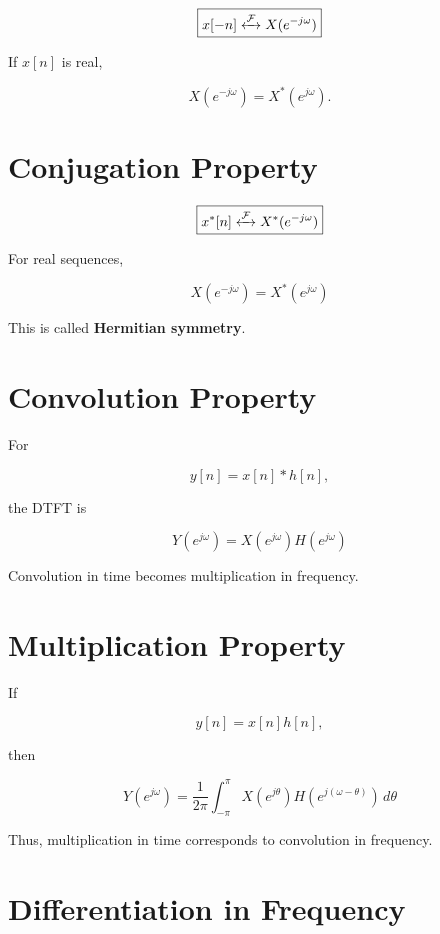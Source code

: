 \[
\boxed{
x[-n]
\xleftrightarrow{\mathcal{F}}
X(e^{-j\omega})
}
\]

If \(x[n]\) is real,

\[
X(e^{-j\omega})=X^*(e^{j\omega}).
\]


\section{Conjugation Property}

\[
\boxed{
x^*[n]
\xleftrightarrow{\mathcal{F}}
X^*(e^{-j\omega})
}
\]

For real sequences,

\[
\boxed{
X(e^{-j\omega})=X^*(e^{j\omega})
}
\]

This is called \textbf{Hermitian symmetry}.


\section{Convolution Property}

For

\[
y[n]=x[n]*h[n],
\]

the DTFT is

\[
\boxed{
Y(e^{j\omega})=
X(e^{j\omega})H(e^{j\omega})
}
\]

Convolution in time becomes multiplication in frequency.


\section{Multiplication Property}

If

\[
y[n]=x[n]h[n],
\]

then

\[
\boxed{
Y(e^{j\omega})=
\frac{1}{2\pi}
\int_{-\pi}^{\pi}
X(e^{j\theta})
H(e^{j(\omega-\theta)})
\,d\theta
}
\]

Thus, multiplication in time corresponds to convolution in frequency.


\section{Differentiation in Frequency}

